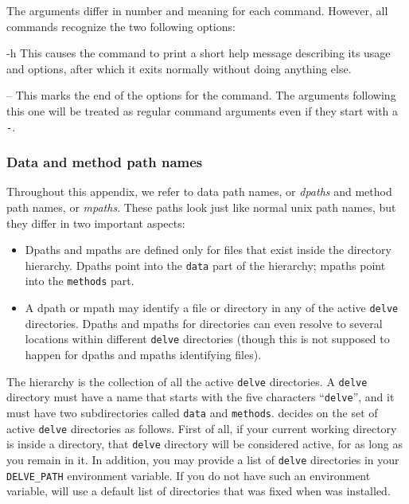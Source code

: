The arguments differ in number and meaning for each command.  However,
all commands recognize the two following options: 
\begin{ttdescription}
\item[-h]
    This causes the command to print a short help message describing
    its usage and options, after which it exits normally without
    doing anything else.
\item[--]
    This marks the end of the options for the command.  The arguments
    following this one will be treated as regular command arguments
    even if they start with a \texttt{-}.
\end{ttdescription}

\subsubsection*{Data and method path names}
Throughout this appendix, we refer to data path names, or \emph{dpaths} and
method path names, or \emph{mpaths}.  These paths look just like normal
unix path names, but they differ in two important aspects:\vspace{-4pt}
\begin{itemize}
\item
    Dpaths and mpaths are defined only for files that
    exist inside the \delve{} directory hierarchy.  Dpaths
    point into the \texttt{data} part of the hierarchy; mpaths
    point into the \texttt{methods} part.
\item
    A dpath or mpath may identify a file or directory in any
    of the active \texttt{delve} directories.  Dpaths and mpaths
    for directories can even resolve to several locations
    within different \texttt{delve} directories (though this is
    not supposed to happen for dpaths and mpaths identifying files).
\end{itemize}\vspace{-4pt}

The \delve{} hierarchy is the collection of all the active
\texttt{delve} directories. A \texttt{delve} directory must have a
name that starts with the five characters ``\texttt{delve}'', and it
must have two subdirectories called \texttt{data} and
\texttt{methods}.  \delve{} decides on the set of active
\texttt{delve} directories as follows.  First of all, if your current
working directory is inside a \texttt{\delve} directory, that
\texttt{delve} directory will be considered active, for as long as you
remain in it.  In addition, you may provide a list of \texttt{delve}
directories in your \texttt{DELVE\_PATH} environment variable.  If you
do not have such an environment variable, \delve{} will use a default
list of directories that was fixed when \delve{} was installed.

